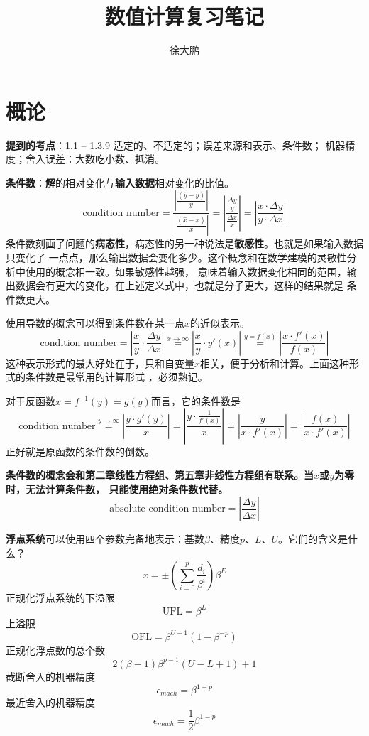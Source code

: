 \documentclass[14pt, letterpaper, UTF8, fontset=windowsnew, heading=true]{article}
\author{徐大鹏}
\title{数值计算复习笔记}
\providecommand{\abs}[1]{\left\vert#1\right\vert}
\begin{document}
\maketitle

\part{概论}
\textbf{提到的考点}：1.1 -- 1.3.9 适定的、不适定的；误差来源和表示、条件数；
机器精度；舍入误差：大数吃小数、抵消。
\par
\textbf{条件数}：\textbf{解}的相对变化与\textbf{输入数据}相对变化的比值。
$$\text{condition number}=\frac{\abs{\frac{(\hat{y}-y)}{y}}}{\abs{\frac{(\hat{x}-x)}{x}}}
=\left\vert\frac{\frac{\Delta y}{y}}{\frac{\Delta x}{x}}\right\vert
=\left\vert\frac{x\cdot\Delta y}{y\cdot\Delta x}\right\vert$$
条件数刻画了问题的\textbf{病态性}，病态性的另一种说法是\textbf{敏感性}。也就是如果输入数据只变化了
一点点，那么输出数据会变化多少。这个概念和在数学建模的灵敏性分析中使用的概念相一致。如果敏感性越强，
意味着输入数据变化相同的范围，输出数据会有更大的变化，在上述定义式中，也就是分子更大，这样的结果就是
条件数更大。
\par

使用导数的概念可以得到条件数在某一点$x$的近似表示。
$$\text{condition number}=\left\vert\frac{x}{y}\cdot\frac{\Delta y}{\Delta x}\right\vert
\stackrel{x\rightarrow \infty}{=}\left\vert\frac{x}{y}\cdot y'(x)\right\vert
\stackrel{y=f(x)}{=}\left\vert\frac{x\cdot f'(x)}{f(x)}\right\vert$$
这种表示形式的最大好处在于，只和自变量$x$相关，便于分析和计算。上面这种形式的条件数是最常用的计算形式
，必须熟记。
\par

对于反函数$x = f^{-1}(y) = g(y)$而言，它的条件数是
$$\text{condition number}\stackrel{y\rightarrow\infty}{=}\left\vert\frac{y\cdot g'(y)}{x}\right\vert
=\left\vert\frac{y\cdot \frac{1}{f'(x)}}{x}\right\vert
=\left\vert\frac{y}{x\cdot f'(x)}\right\vert
=\left\vert\frac{f(x)}{x\cdot f'(x)}\right\vert$$
正好就是原函数的条件数的倒数。
\par

\textbf{条件数的概念会和第二章线性方程组、第五章非线性方程组有联系。当$x$或$y$为零时，无法计算条件数，
只能使用绝对条件数代替。}$$\text{absolute condition number}=\left\vert\frac{\Delta y}{\Delta x}\right\vert$$
\par

\textbf{浮点系统}可以使用四个参数完备地表示：基数$\beta$、精度$p$、$L$、$U$。它们的含义是什么？
$$x=\pm\left( \sum_{i=0}^p\frac{d_i}{\beta^i} \right)\beta^E$$
正规化浮点系统的下溢限
$$\text{UFL}=\beta^L$$
上溢限
$$\text{OFL}=\beta^{U+1}(1-\beta^{-p})$$
正规化浮点数的总个数
$$2(\beta-1)\beta^{p-1}(U-L+1)+1$$
截断舍入的机器精度
$$\epsilon_{mach}=\beta^{1-p}$$
最近舍入的机器精度
$$\epsilon_{mach}=\frac{1}{2}\beta^{1-p}$$
\end{document}
